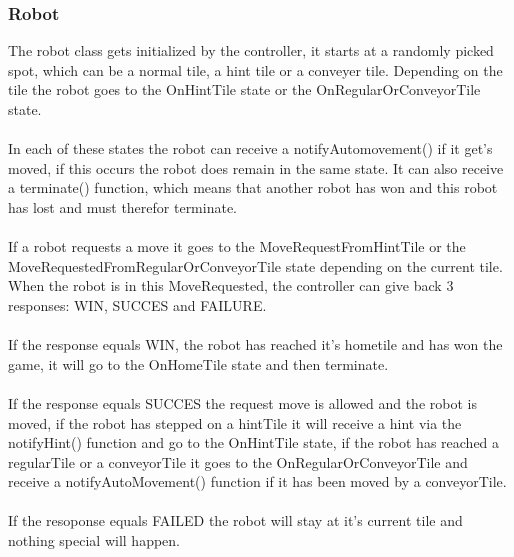 	\subsubsection{Robot}
	The robot class gets initialized by the controller, it starts at a randomly picked spot, which can be a normal tile, a hint tile or a conveyer tile. Depending on the tile the robot goes to the OnHintTile state or the OnRegularOrConveyorTile state.\\
\\
In each of these states the robot can receive a notifyAutomovement() if it get's moved, if this occurs the robot does remain in the same state. It can also receive a terminate() function, which means that another robot has won and this robot has lost and must therefor terminate.\\
\\
If a robot requests a move it goes to the MoveRequestFromHintTile or the MoveRequestedFromRegularOrConveyorTile state depending on the current tile. When the robot is in this MoveRequested, the controller can give back 3 responses: WIN, SUCCES and FAILURE.\\
\\
If the response equals WIN, the robot has reached it's hometile and has won the game, it will go to the OnHomeTile state and then terminate. \\
\\
If the response equals SUCCES the request move is allowed and the robot is moved, if the robot has stepped on a hintTile it will receive a hint via the notifyHint() function and go to the OnHintTile state, if the robot has reached a regularTile or a conveyorTile it goes to the OnRegularOrConveyorTile and receive a notifyAutoMovement() function if it has been moved by a conveyorTile.\\
\\
If the resoponse equals FAILED the robot will stay at it's current tile and nothing special will happen.\\
	
